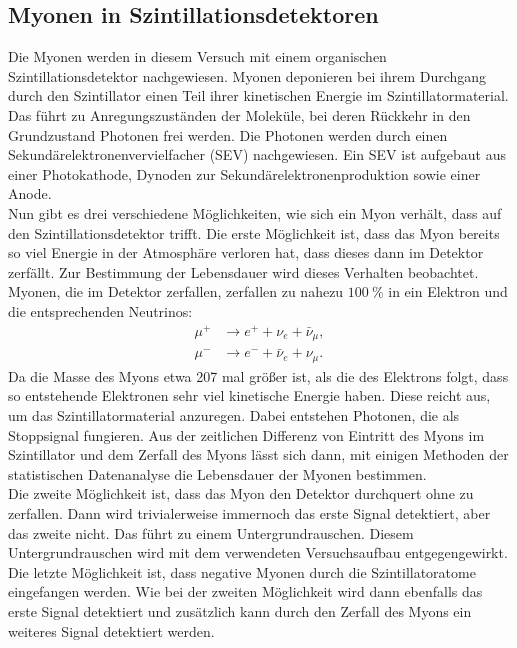 \documentclass[
  bibliography=totoc,     %
  captions=tableheading,  %
  titlepage=firstiscover, %
]{scrartcl}
\begin{document}
  \subsection{Myonen in Szintillationsdetektoren}
  Die Myonen werden in diesem Versuch mit einem organischen Szintillationsdetektor nachgewiesen.
  Myonen deponieren bei ihrem Durchgang durch den Szintillator einen Teil ihrer
  kinetischen Energie im Szintillatormaterial.
  Das führt zu Anregungszuständen der Moleküle, bei deren Rückkehr in
  den Grundzustand Photonen frei werden. Die Photonen werden durch einen
  Sekundärelektronenvervielfacher (SEV) nachgewiesen. Ein SEV ist aufgebaut aus
  einer Photokathode, Dynoden zur Sekundärelektronenproduktion sowie
  einer Anode.\\
  Nun gibt es drei verschiedene Möglichkeiten, wie sich ein Myon verhält, dass
  auf den Szintillationsdetektor trifft.
    Die erste Möglichkeit ist, dass das Myon bereits so viel Energie in der Atmosphäre
    verloren hat, dass dieses dann im Detektor zerfällt. Zur Bestimmung der
    Lebensdauer wird dieses Verhalten beobachtet. Myonen, die im Detektor
    zerfallen, zerfallen zu nahezu $\SI{100}{\percent}$ in ein Elektron und die entsprechenden Neutrinos:
    \begin{align*}
      \mu^+ &\to e^+ + \nu_{e} + \bar{\nu}_{\mu},\\
      \mu^- &\to e^- + \bar{\nu}_{e} +  \nu_{\mu}.
    \end{align*}
    Da die Masse des Myons etwa 207 mal größer ist, als die des Elektrons folgt,
    dass so entstehende Elektronen sehr viel kinetische Energie haben. Diese
    reicht aus, um das Szintillatormaterial anzuregen. Dabei entstehen Photonen,
    die als Stoppsignal fungieren. Aus der zeitlichen Differenz von Eintritt des Myons im
    Szintillator und dem Zerfall des Myons lässt sich dann, mit einigen Methoden
    der statistischen Datenanalyse die Lebensdauer der Myonen bestimmen.\\
    Die zweite Möglichkeit ist, dass das Myon den Detektor durchquert ohne zu
    zerfallen. Dann wird trivialerweise immernoch das erste Signal detektiert,
    aber das zweite nicht. Das führt zu einem Untergrundrauschen. Diesem
    Untergrundrauschen wird mit dem verwendeten Versuchsaufbau entgegengewirkt.\\
    Die letzte Möglichkeit ist, dass negative Myonen durch die Szintillatoratome
    eingefangen werden. Wie bei der zweiten Möglichkeit wird dann ebenfalls
    das erste Signal detektiert und zusätzlich kann durch den Zerfall des Myons
    ein weiteres Signal detektiert werden.
\end{document}
